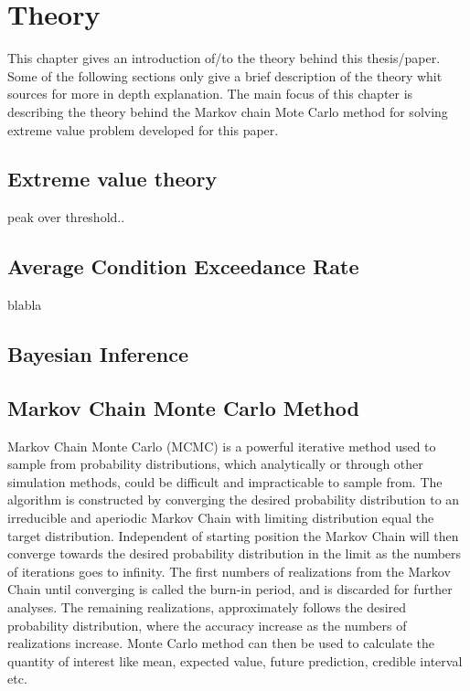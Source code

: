 \chapter[Theory]{Theory}
This chapter gives an introduction of/to the theory behind this thesis/paper. Some of the following sections only give a brief description of the theory whit sources for more in depth explanation. The main focus of this chapter is describing the theory behind the Markov chain Mote Carlo method for solving extreme value problem developed for this paper. 
\section{Extreme value theory}
peak over threshold..
\section{Average Condition Exceedance Rate}
blabla

\section{Bayesian Inference}
\label{ch:BayesianInference}

\section{Markov Chain Monte Carlo Method}
\label{ch:mcmc}
Markov Chain Monte Carlo (MCMC) is a powerful iterative method used to sample from probability distributions, which analytically or through other simulation methods, could be difficult and impracticable to sample from. The algorithm is constructed by converging the desired probability distribution to an irreducible and aperiodic Markov Chain with limiting distribution equal the target distribution. Independent of starting position the Markov Chain will then converge towards the desired probability distribution in the limit as the numbers of iterations goes to infinity. The first numbers of realizations from the Markov Chain until converging is called the burn-in period, and is discarded for further analyses. The remaining realizations, approximately follows the desired probability distribution, where the accuracy increase as the numbers of realizations increase. Monte Carlo method can then be used to calculate the quantity of interest like mean, expected value, future prediction, credible interval etc.
\cite[p.~201]{compstat}\\ %
\cite{MCMC}\\ %
\cite[p.220]{compstat}\\%


